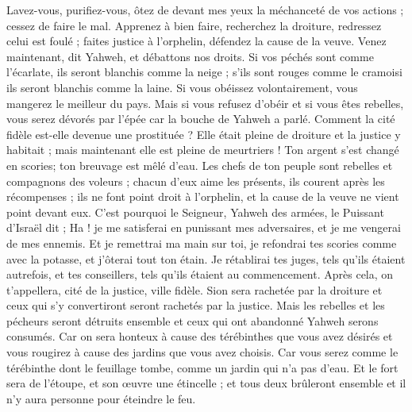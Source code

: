 \begin{multicols}{2}
Lavez-vous, purifiez-vous, ôtez de devant mes yeux la méchanceté de vos actions ; cessez de faire le mal.
Apprenez à bien faire, recherchez la droiture, redressez celui est foulé ; faites justice à l'orphelin, défendez la cause de la veuve.
Venez maintenant, dit Yahweh, et débattons nos droits. Si vos péchés sont comme l'écarlate, ils seront blanchis comme la neige ; s'ils sont rouges comme le cramoisi ils seront blanchis comme la laine.
Si vous obéissez volontairement, vous mangerez le meilleur du pays.
Mais si vous refusez d'obéir et si vous êtes rebelles, vous serez dévorés par l'épée car la bouche de Yahweh a parlé.
Comment la cité fidèle est-elle devenue une prostituée ? Elle était pleine de droiture et la justice y habitait ; mais maintenant elle est pleine de meurtriers !
Ton argent s'est changé en scories; ton breuvage est mêlé d'eau. 
Les chefs de ton peuple sont rebelles et compagnons des voleurs ; chacun d'eux aime les présents, ils courent après les récompenses ; ils ne font point droit à l'orphelin, et la cause de la veuve ne vient point devant eux. 
C'est pourquoi le Seigneur, Yahweh des armées, le Puissant d'Israël dit ; Ha ! je me satisferai en punissant mes adversaires, et je me vengerai de mes ennemis. 
Et je remettrai ma main sur toi, je refondrai tes scories comme avec la potasse, et j'ôterai tout ton étain. 
Je rétablirai tes juges, tels qu'ils étaient autrefois, et tes conseillers, tels qu'ils étaient au commencement. Après cela, on t'appellera, cité de la justice, ville fidèle.
Sion sera rachetée par la droiture et ceux qui s'y convertiront seront rachetés par la justice.
Mais les rebelles et les pécheurs seront détruits ensemble et ceux qui ont abandonné Yahweh serons consumés.
Car on sera honteux à cause des térébinthes que vous avez désirés et vous rougirez à cause des jardins que vous avez choisis.
Car vous serez comme le térébinthe dont le feuillage tombe, comme un jardin qui n'a pas d'eau.
Et le fort sera de l'étoupe, et son œuvre une étincelle ; et tous deux brûleront ensemble et il n'y aura personne pour éteindre le feu.

\end{multicols}
